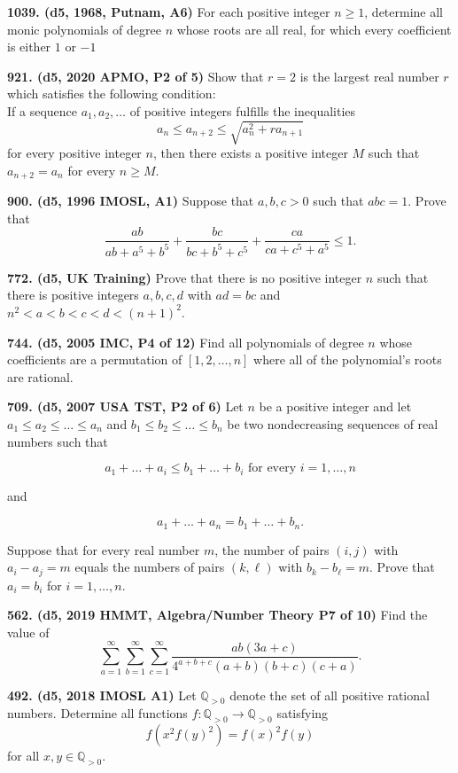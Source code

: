 \documentclass{article}
\begin{document}
\textbf{1039. (\color{red}d5\color{black}, 1968, Putnam, A6)} For each positive integer $n \geq 1$, determine all monic polynomials of degree $n$ whose roots are all real, for which every coefficient is either $1$ or $-1$

\textbf{921. (\color{red}d5\color{black}, 2020 APMO, P2 of 5)} Show that \(r = 2\) is the largest real number \(r\) which satisfies the following condition:\\
If a sequence \(a_1, a_2, \dots\) of positive integers fulfills the inequalities \[a_n \leq a_{n+2} \leq  \sqrt{a_n^2 + ra_{n+1}}\] for every positive integer \(n\), then there exists a positive integer \(M\) such that \(a_{n+2} = a_n\) for every \(n \geq M\).

\textbf{900. (\color{red}d5\color{black}, 1996 IMOSL, A1)} Suppose that $a, b, c > 0$ such that $abc = 1$. Prove that \[ \frac{ab}{ab + a^5 + b^5} + \frac{bc}{bc + b^5 + c^5} + \frac{ca}{ca + c^5 + a^5} \leq 1. \]

\textbf{772. (\color{red}d5\color{black}, UK Training)} Prove that there is no positive integer $n$ such that there is positive integers $a, b, c, d$ with $ad = bc$ and $n^2 < a < b< c< d < (n + 1)^2$.

\textbf{744. (\color{red}d5\color{black}, 2005 IMC, P4 of 12)} Find all polynomials of degree $n$ whose coefficients are a permutation of $[1, 2, \dots, n]$ where all of the polynomial's roots are rational.

\textbf{709. (\color{red}d5\color{black}, 2007 USA TST, P2 of 6)} Let $n$ be a positive integer and let $a_1 \le a_2 \le \dots \le a_n$ and $b_1 \le b_2 \le \dots \le b_n$ be two nondecreasing sequences of real numbers such that

\[ a_1 + \dots + a_i \le b_1 + \dots + b_i  \text{ for every } i = 1, \dots, n \]

and

\[ a_1 + \dots + a_n = b_1 + \dots + b_n. \]

Suppose that for every real number $m$, the number of pairs $(i,j)$ with $a_i-a_j=m$ equals the numbers of pairs $(k,\ell)$ with $b_k-b_\ell = m$. Prove that $a_i = b_i$ for $i=1,\dots,n$.

\textbf{562. (\color{red}d5\color{black}, 2019 HMMT, Algebra/Number Theory P7 of 10)} Find the value of
\[\sum_{a = 1}^{\infty} \sum_{b = 1}^{\infty} \sum_{c = 1}^{\infty} \frac{ab(3a + c)}{4^{a+b+c} (a+b)(b+c)(c+a)}.\]

\textbf{492. (\color{red}d5\color{black}, 2018 IMOSL A1)} Let $\mathbb{Q}_{>0}$ denote the set of all positive rational numbers. Determine all functions $f:\mathbb{Q}_{>0}\to\mathbb{Q}_{>0}$ satisfying \begin{equation*}f(x^2f(y)^2) = f(x)^2f(y)\end{equation*} for all $x,y \in \mathbb{Q}_{>0}$.
\end{document}
